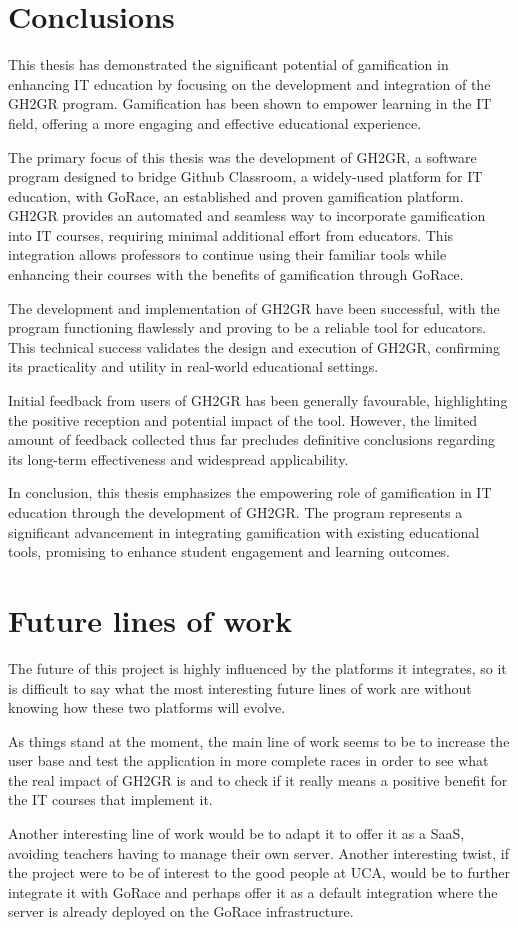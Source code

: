\section{Conclusions}
This thesis has demonstrated the significant potential of gamification in enhancing IT education by focusing on the development and integration of the GH2GR program. Gamification has been shown to empower learning in the IT field, offering a more engaging and effective educational experience.

The primary focus of this thesis was the development of GH2GR, a software program designed to bridge Github Classroom, a widely-used platform for IT education, with GoRace, an established and proven gamification platform. GH2GR provides an automated and seamless way to incorporate gamification into IT courses, requiring minimal additional effort from educators. This integration allows professors to continue using their familiar tools while enhancing their courses with the benefits of gamification through GoRace.

The development and implementation of GH2GR have been successful, with the program functioning flawlessly and proving to be a reliable tool for educators. This technical success validates the design and execution of GH2GR, confirming its practicality and utility in real-world educational settings.

Initial feedback from users of GH2GR has been generally favourable, highlighting the positive reception and potential impact of the tool. However, the limited amount of feedback collected thus far precludes definitive conclusions regarding its long-term effectiveness and widespread applicability.

In conclusion, this thesis emphasizes the empowering role of gamification in IT education through the development of GH2GR. The program represents a significant advancement in integrating gamification with existing educational tools, promising to enhance student engagement and learning outcomes.

\section{Future lines of work}
The future of this project is highly influenced by the platforms it integrates, so it is difficult to say what the most interesting future lines of work are without knowing how these two platforms will evolve.

As things stand at the moment, the main line of work seems to be to increase the user base and test the application in more complete races in order to see what the real impact of GH2GR is and to check if it really means a positive benefit for the \acrshort{IT} courses that implement it.

Another interesting line of work would be to adapt it to offer it as a \acrshort{SaaS}, avoiding teachers having to manage their own server. Another interesting twist, if the project were to be of interest to the good people at \acrshort{UCA}, would be to further integrate it with GoRace and perhaps offer it as a default integration where the server is already deployed on the GoRace infrastructure.


